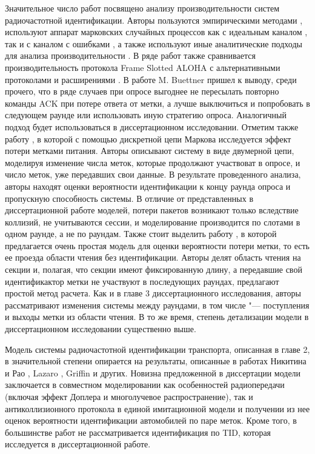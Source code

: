 Значительное число работ посвящено анализу производительности систем радиочастотной идентификации. Авторы пользуются эмпирическими методами \cite{Buettner2008}, используют аппарат марковских случайных процессов как с идеальным каналом \cite{Vogt2002, Wang2009, Vahedi2012, Vales-Alonso2009, Vales-Alonso2011, Tong2007, Vales-Alonso2017}, так и с каналом с ошибками \cite{DiMarco2014}, а также используют иные аналитические подходы для анализа производительности \cite{Ahmed2016, Yan2014, Jeon2009, Kim2007}. В ряде работ также сравнивается производительность протокола Frame Slotted ALOHA с альтернативными протоколами и расширениями \cite{Vahedi2014, LaPorta2011}. В работе \cite{Buettner2008} M. Buettner пришел к выводу, среди прочего, что в ряде случаев при опросе выгоднее не пересылать повторно команды ACK при потере ответа от метки, а лучше выключиться и попробовать в следующем раунде или использовать иную стратегию опроса. Аналогичный подход будет использоваться в диссертационном исследовании. Отметим также работу \cite{Vales-Alonso2017}, в которой с помощью дискретной цепи Маркова исследуется эффект потери метками питания. Авторы описывают систему в виде двумерной цепи, моделируя изменение числа меток, которые продолжают участвоват в опросе, и число меток, уже передавших свои данные. В результате проведенного анализа, авторы находят оценки вероятности идентификации к концу раунда опроса и пропускную способность системы. В отличие от представленных в диссертационной работе моделей, потери пакетов возникают только вследствие коллизий, не учитываются сессии, и моделирование производится по слотами в одном раунде, а не по раундам. Также стоит выделить работу \cite{Pawowicz2020}, в которой предлагается очень простая модель для оценки вероятности потери метки, то есть ее проезда области чтения без идентификации. Авторы делят область чтения на секции и, полагая, что секции имеют фиксированную длину, а передавшие свой идентификактор метки не участвуют в последующих раундах, предлагают простой метод расчета. Как и в главе 3 диссертационного исследования, авторы \cite{Pawowicz2020} рассматривают изменения системы между раундами, в том числе "--- поступления и выходы метки из области чтения. В то же время, степень детализации модели в диссертационном исследовании существенно выше.

Модель системы радиочастотной идентификации транспорта, описанная в главе 2, в значительной степени опирается на результаты, описанные в работах Никитина и Рао \cite{Nikitin2008}, Lazaro \cite{Lazaro2009}, Griffin \cite{Griffin2009} и других. Новизна предложенной в диссертации модели заключается в совместном моделировании как особенностей радиопередачи (включая эффект Доплера и многолучевое распространение), так и антиколлизионного протокола в единой имитационной модели и получении из нее оценок вероятности идентификации автомобилей по паре меток. Кроме того, в большинстве работ не рассматривается идентификация по TID, которая исследуется в диссертационной работе.

